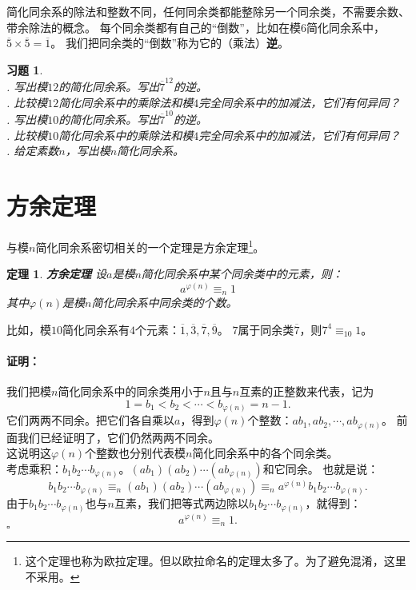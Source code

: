 \documentclass[12pt,UTF8]{ctexbook}
\newtheorem{tm}{定理}[section]
\renewenvironment{proof}{\paragraph{\textbf{证明：}}}{\hfill$\square$}
\newtheorem{xt}{习题}[section]
\begin{document}
简化同余系的除法和整数不同，任何同余类都能整除另一个同余类，不需要余数、带余除法的概念。
每个同余类都有自己的“倒数”，比如在模$6$简化同余系中，$\overline{5}\times\overline{5} = \overline{1}$。
我们把同余类的“倒数”称为它的（乘法）\textbf{逆}。

\begin{xt}
    \mbox{}\\
    . 写出模$12$的简化同余系。写出$\overline{7}^{12}$的逆。\\
    . 比较模$12$简化同余系中的乘除法和模$4$完全同余系中的加减法，它们有何异同？\\
    . 写出模$10$的简化同余系。写出$\overline{7}^{10}$的逆。\\
    . 比较模$10$简化同余系中的乘除法和模$4$完全同余系中的加减法，它们有何异同？\\
    . 给定素数$n$，写出模$n$简化同余系。
\end{xt}

\section{方余定理}
与模$n$简化同余系密切相关的一个定理是方余定理\footnote{这个定理也称为欧拉定理。但以欧拉命名的定理太多了。为了避免混淆，这里不采用。}。
\begin{tm}{\textbf{方余定理} }\label{tm:3-3-0}
    设$a$是模$n$简化同余系中某个同余类中的元素，则：
    $$ a^{\varphi(n)} \equiv_n 1 $$
    其中$\varphi(n)$是模$n$简化同余系中同余类的个数。
\end{tm}
比如，模$10$简化同余系有$4$个元素：$\overline{1}, \overline{3},\overline{7},\overline{9}$。
$7$属于同余类$\overline{7}$，则$7^4 \equiv_{10} 1$。

\begin{proof}
    我们把模$n$简化同余系中的同余类用小于$n$且与$n$互素的正整数来代表，记为
    $$1 = b_1 < b_2 < \cdots < b_{\varphi(n)} = n-1.$$
    它们两两不同余。把它们各自乘以$a$，得到$\varphi(n)$个整数：$ab_1, ab_2, \cdots , ab_{\varphi(n)}$。
    前面我们已经证明了，它们仍然两两不同余。\\
    这说明这$\varphi(n)$个整数也分别代表模$n$简化同余系中的各个同余类。\\
    考虑乘积：$b_1 b_2 \cdots b_{\varphi(n)}$。$(ab_1) (ab_2) \cdots (ab_{\varphi(n)})$和它同余。
    也就是说：
    $$b_1 b_2 \cdots b_{\varphi(n)} \equiv_n (ab_1) (ab_2) \cdots (ab_{\varphi(n)}) \equiv_n a^{\varphi(n)} b_1 b_2 \cdots b_{\varphi(n)}.$$
    由于$b_1 b_2 \cdots b_{\varphi(n)}$也与$n$互素，我们把等式两边除以$b_1 b_2 \cdots b_{\varphi(n)}$，就得到：
    $$ a^{\varphi(n)} \equiv_n 1 . $$
\end{proof}
\end{document}

